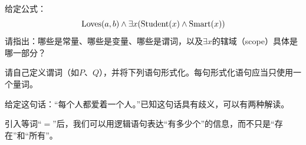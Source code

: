 \documentclass{quiz}
\begin{document}

\begin{questions}
  
  \question 给定公式：
    \[ \operatorname{Loves}(a, b) \land \exists x (\operatorname{Student}(x) \land \operatorname{Smart}(x)) \]
    请指出：哪些是常量、哪些是变量、哪些是谓词，以及$\exists x$的辖域（scope）具体是哪一部分？
  \vspace{1.5in}
  
  \question 请自己定义谓词（如$P$、$Q$），并将下列语句形式化。每句形式化语句应当只使用一个量词。
  \vspace{2.5in}
  
  \question 给定这句话：“每个人都爱着一个人。”已知这句话具有歧义，可以有两种解读。
  \clearpage
  
  \question 引入等词“$=$”后，我们可以用逻辑语句表达“有多少个”的信息，而不只是“存在”和“所有”。
\end{questions}
\end{document}
